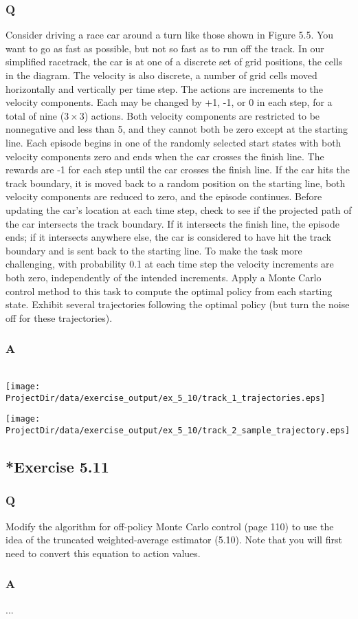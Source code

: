 \subsubsection*{Q}
Consider driving a race car around a turn like those shown in Figure 5.5. You want to go as fast as possible, but not so fast as to run off the track. In our simplified racetrack, the car is at one of a discrete set of grid positions, the cells in the diagram. The velocity is also discrete, a number of grid cells moved horizontally and vertically per time step. The actions are increments to the velocity components. Each may be changed by +1, -1, or 0 in each step, for a total of nine ($3 \times 3$) actions. Both velocity components are restricted to be nonnegative and less than 5, and they cannot both be zero except at the starting line. Each episode begins in one of the randomly selected start states with both velocity components zero and ends when the car crosses the finish line. The rewards are -1 for each step until the car crosses the finish line. If the car hits the track boundary, it is moved back to a random position on the starting line, both velocity components are reduced to zero, and the episode continues. Before updating the car’s location at each time step, check to see if the projected path of the car intersects the track boundary. If it intersects the finish line, the episode ends; if it intersects anywhere else, the car is considered to have hit the track boundary and is sent back to the starting line. To make the task more challenging, with probability 0.1 at each time step the velocity increments are both zero, independently of the intended increments. Apply a Monte Carlo control method to this task to compute the optimal policy from each starting state. Exhibit several trajectories following the optimal policy (but turn the noise off for these trajectories).
\subsubsection*{A}
\ProgrammingExercise\\
\texttt{[image: \\ProjectDir/data/exercise\_output/ex\_5\_10/track\_1\_trajectories.eps]}

\texttt{[image: \\ProjectDir/data/exercise\_output/ex\_5\_10/track\_2\_sample\_trajectory.eps]}

\subsection{*Exercise 5.11}
\subsubsection*{Q}
Modify the algorithm for off-policy Monte Carlo control (page 110) to use the idea of the truncated weighted-average estimator (5.10). Note that you will first need to convert this equation to action values.

\subsubsection*{A}
... 
